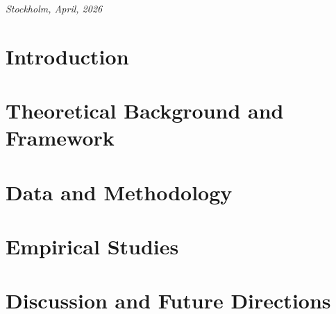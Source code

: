 \documentclass[twoside,11pt,american,openright,final]{memoir}
\begin{document}
\par\bigskip
\begin{center}
\emph{Stockholm, April, 2026}\par\smallskip
\emph{\theauthor}
\end{center}
\cleardoublepage


\tableofcontents*%
\cleardoublepage%
\mainmatter%

\chapter[Introduction]{Introduction}\label{chap:introduction} %

\chapter[Theoretical Background and Framework]{Theoretical Background and Framework}\label{chap:theoryframework} %
 

\chapter[Data and Methodology]{Data and Methodology}\label{chap:datamethod} %
 

\chapter[Empirical Studies]{Empirical Studies}\label{chap:study} %
 

\chapter[Discussion and Future Directions]{Discussion and Future Directions}\label{chap:discussion} %
 
\end{document}
